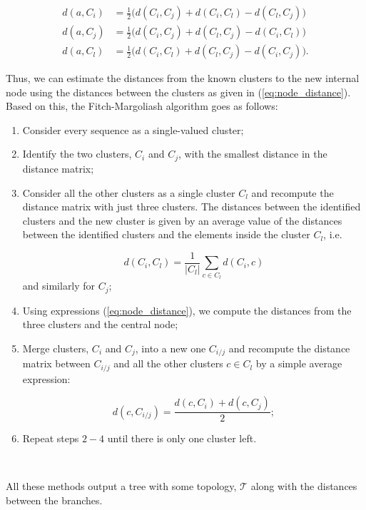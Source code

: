 \begin{eqnarray}
d(a, C_i) &= \frac{1}{2}\bigg(d(C_i, C_j) + d(C_i, C_l) - d(C_l, C_j)\bigg)\nonumber \\
d(a, C_j) &= \frac{1}{2}\bigg(d(C_i, C_j) + d(C_l, C_j) - d(C_i, C_l)\bigg)\label{eq:node_distance}\\
d(a, C_l) &= \frac{1}{2}\bigg(d(C_i, C_l) + d(C_l, C_j) - d(C_i, C_j)\bigg).\nonumber 
\end{eqnarray}

Thus, we can estimate the distances from the known clusters to the new internal node using the distances between the clusters as given in (\ref{eq:node_distance}). Based on this, the Fitch-Margoliash algorithm goes as follows:

\begin{enumerate}
    \item Consider every sequence as a single-valued cluster;
    \item Identify the two clusters, $C_i$ and $C_j$, with the smallest distance in the distance matrix;
    \item Consider all the other clusters as a single cluster $C_l$ and recompute the distance matrix with just three clusters. The distances between the identified clusters and the new cluster is given by an average value of the distances between the identified clusters and the elements inside the cluster $C_l$, i.e.
    
    $$d(C_i, C_l) = \frac{1}{|C_l|} \sum_{c\in C_l} d(C_i, c)$$
    and similarly for $C_j$;
    \item Using expressions (\ref{eq:node_distance}), we compute the distances from the three clusters and the central node;
    \item  Merge clusters, $C_i$ and $C_j$, into a new one $C_{i/j}$ and recompute the distance matrix between $C_{i/j}$ and all the other clusters $c\in C_l$ by a simple average expression:
    
    $$d(c, C_{i/j}) = \frac{d(c, C_i) + d(c, C_j)}{2};$$
    
    \item Repeat steps $2-4$ until there is only one cluster left.
\end{enumerate}


\

All these methods output a tree with some topology, $\mathcal{T}$ along with the distances between the branches. 



